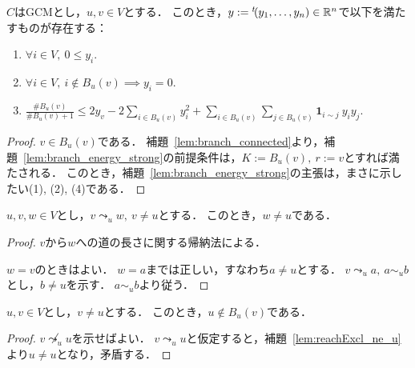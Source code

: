 \begin{lemma}
  \label{lem:branch_marking}
  \leanok
  $C$はGCMとし，$u, v \in V$とする．
  このとき，$y := {}^t\!(y_1, \ldots, y_n) \in \mathbb{R}^n$で以下を満たすものが存在する：
  \begin{enumerate}[label = (y\arabic*)]
    \item $\forall i \in V,\ 0 \le y_i$.
    \item $\forall i \in V,\ i \notin B_u(v) \implies y_i = 0$.
    \setcounter{enumi}{3}
    \item $\displaystyle \frac{\# B_u(v)}{\# B_u(v) + 1} \le 2 y_v - 2 \sum_{i \in B_u(v)} y_i ^ 2 + \sum_{i \in B_u(v)} \sum_{j \in B_u(v)} \bm{1}_{i \sim j}\ y_i y_j$.
  \end{enumerate}
\end{lemma}

\begin{proof}
  $v \in B_u(v)$である．
  補題~\ref{lem:branch_connected}より，補題~\ref{lem:branch_energy_strong}の前提条件は，$K := B_u(v),\ r := v$とすれば満たされる．
  このとき，補題~\ref{lem:branch_energy_strong}の主張は，まさに示したい(1), (2), (4)である．
\end{proof}

\begin{lemma}
  \label{lem:reachExcl_ne_u}
  \leanok
  \uses{}
  $u, v, w \in V$とし，$v \leadsto_u w,\ v \ne u$とする．
  このとき，$w \ne u$である．
\end{lemma}

\begin{proof}
  $v$から$w$への道の長さに関する帰納法による．

  $w = v$のときはよい．
  $w = a$までは正しい，すなわち$a \ne u$とする．
  $v \leadsto_u a,\ a \sim_u b$とし，$b \ne u$を示す．
  $a \sim_u b$より従う．
\end{proof}

\begin{lemma}
  \label{lem:u_notMem_branch}
  \leanok
  $u, v \in V$とし，$v \ne u$とする．
  このとき，$u \notin B_u(v)$である．
\end{lemma}

\begin{proof}
  $v \not \leadsto_u u$を示せばよい．
  $v \leadsto_u u$と仮定すると，補題~\ref{lem:reachExcl_ne_u}より$u \ne u$となり，矛盾する．
\end{proof}

